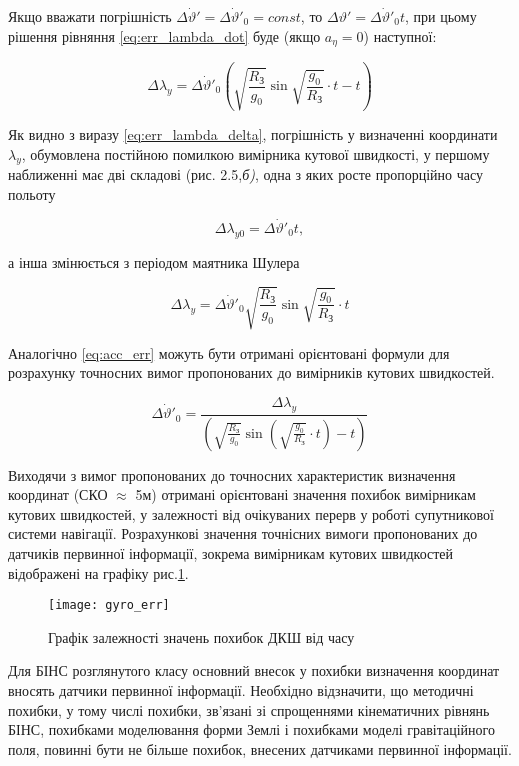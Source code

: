 Якщо вважати погрішність $\Delta \dot{\vartheta }'=\Delta \dot{\vartheta }'_{0} =const$, то $\Delta \vartheta '=\Delta \dot{\vartheta }'_{0} t$, при цьому рішення рівняння 
\eqref{eq:err_lambda_dot} буде (якщо $a_{\eta } =0$) наступної:

\begin{equation} 
\label{eq:err_lambda_delta} 
\Delta \lambda _{y} =\Delta \dot{\vartheta }'_{0} \left(\sqrt{\frac{R_{\text{З}} }{g_{0} } } \sin \sqrt{\frac{g_{0} }{R_{\text{З}} } } \cdot t-t\right)
\end{equation} 


Як видно з виразу \eqref{eq:err_lambda_delta},  погрішність у визначенні координати  $\lambda _{y} $, обумовлена постійною  помилкою  вимірника кутової швидкості, у першому наближенні має дві складові (рис. 2.5,\textit{б)}, одна  з яких  росте пропорційно  часу польоту

\[\Delta \lambda _{y0} =\Delta \dot{\vartheta }'_{0} t,\] 

а інша  змінюється з періодом маятника Шулера

\[\Delta \lambda _{y} =\Delta \dot{\vartheta }'_{0} \sqrt{\frac{R_{\text{З}} }{g_{0} } } \sin \sqrt{\frac{g_{0} }{R_{\text{З}} } } \cdot t\] 


Аналогічно \eqref{eq:acc_err} можуть бути отримані орієнтовані формули для розрахунку точносних вимог 
пропонованих до вимірників кутових швидкостей.

\[\Delta \dot{\vartheta }'_{0} =\frac{\Delta \lambda _{y} }{\left(\sqrt{\frac{R_{{\text{З}}} }{g_{0} } } \sin \left(\sqrt{\frac{g_{0} }{R_{{\text{З}}} } } \cdot t\right)-t\right)} \] 

Виходячи з вимог пропонованих до точносних характеристик визначення координат (СКО $\approx$ 5м) 
отримані орієнтовані значення похибок вимірникам кутових швидкостей, у залежності від очікуваних 
перерв у роботі супутникової системи навігації. Розрахункові значення точнісних вимоги пропонованих 
до датчиків первинної інформації, зокрема вимірникам кутових швидкостей відображені на графіку рис.\ref{fig:gyro_err}.

\begin{figure}[here]
\centering
\texttt{[image: gyro\_err]}
\caption{Графік залежності значень похибок ДКШ від часу}
\label{fig:gyro_err}
\end{figure} 

Для БІНС розглянутого класу основний внесок у похибки визначення координат вносять датчики первинної 
інформації. Необхідно відзначити, що методичні похибки, у тому числі похибки, зв'язані зі спрощеннями 
кінематичних рівнянь БІНС, похибками моделювання форми Землі і похибками моделі гравітаційного поля, 
повинні бути не більше  похибок, внесених датчиками первинної інформації.

